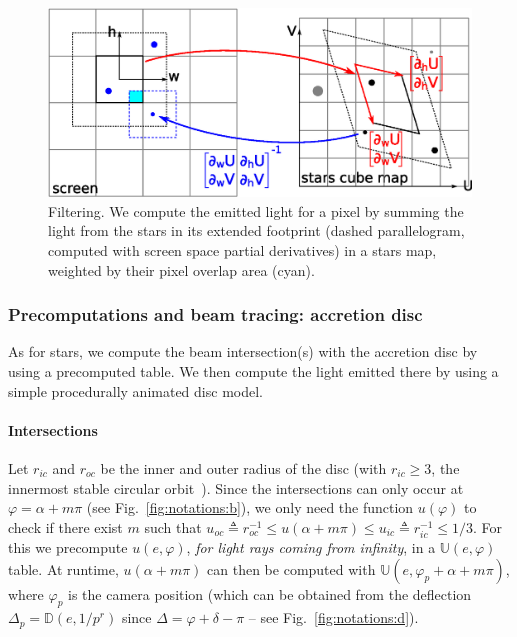 \documentclass{document}
\begin{document}
\begin{figure}[t]
	\centering
	\includegraphics[width=\linewidth]{figures/filtering}
	\caption{\label{fig:filtering}Filtering. We compute the emitted light for a 
	pixel by summing the light from the stars in its extended footprint (dashed 
	parallelogram, computed with screen space partial derivatives) in a stars 
	map, weighted by their pixel overlap area (cyan).}
\end{figure}
  
\subsubsection{Precomputations and beam tracing: accretion disc}

As for stars, we compute the beam intersection(s) with the accretion disc by 
using a precomputed table. We then compute the light emitted there by using a 
simple procedurally animated disc model.

\paragraph*{Intersections} Let $r_{ic}$ and $r_{oc}$ be the inner and outer 
radius of the disc (with $r_{ic}\ge 3$, the innermost stable circular 
orbit~\cite{Lasota2016}). Since the intersections can only occur at 
$\varphi = \alpha + m\pi$ (see Fig.~\ref{fig:notations:b}), we only need the 
function $u(\varphi)$ to check if there exist $m$ such that $u_{oc} \triangleq 
r_{oc}^{-1} \le u(\alpha + m\pi) \le u_{ic} \triangleq r_{ic}^{-1} \le 1 / 3$. 
For this we precompute $u(e, \varphi)$, {\em for light rays coming from 
infinity}, in a $\mathbb{U}(e, \varphi)$ table. At runtime, $u(\alpha + m\pi)$ 
can then be computed with $\mathbb{U}(e, \varphi_p + \alpha + m\pi)$, where 
$\varphi_p$ is the camera position (which can be obtained from the deflection 
$\Delta_p = \mathbb{D}(e, 1/p^r)$ since $\Delta = \varphi + \delta - \pi$ -- 
see Fig.~\ref{fig:notations:d}).
\end{document}
